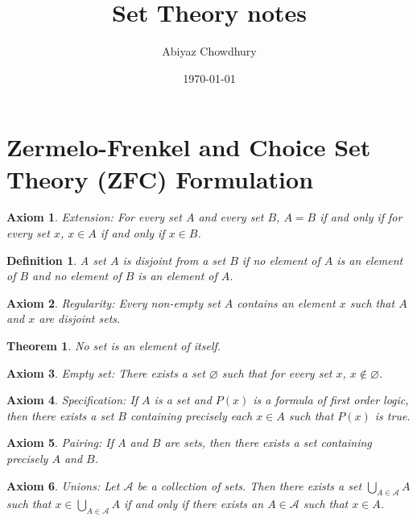 \documentclass[a4paper]{article}
\title{\textbf{Set Theory notes}}
\author{Abiyaz Chowdhury}
\date{\today}
\newtheorem{mytheorem}{Theorem}
\newtheorem{axiom}{Axiom}
\newtheorem{mydef}{Definition}
\numberwithin{mytheorem}{section}
\numberwithin{mydef}{section}
\numberwithin{axiom}{section}
\numberwithin{example}{section}
\begin{document}
\maketitle

\section{Zermelo-Frenkel and Choice Set Theory (ZFC) Formulation}

\begin{axiom} Extension: For every set $A$ and every set $B$, $A = B$ if and only if for every set $x$, $x \in A$ if and only if $x \in B$. 
\end{axiom}

\begin{mydef} A set $A$ is disjoint from a set $B$ if no element of $A$ is an element of $B$ and no element of $B$ is an element of $A$. 
\end{mydef}

\begin{axiom} Regularity: Every non-empty set $A$ contains an element $x$ such that $A$ and $x$ are disjoint sets.
\end{axiom}

\begin{mytheorem} No set is an element of itself. \end{mytheorem}

\begin{axiom} Empty set: There exists a set $\varnothing$ such that for every set $x$, $x \notin \varnothing$.
\end{axiom}


\begin{axiom} Specification: If $A$ is a set and $P(x)$ is a formula of first order logic, then there exists a set $B$ containing precisely each $x \in A$ such that $P(x)$ is true. 
\end{axiom}

\begin{axiom} Pairing: If $A$ and $B$ are sets, then there exists a set containing precisely $A$ and $B$.
\end{axiom}

\begin{axiom} Unions: Let $\mathcal{A}$ be a collection of sets. Then there exists a set $\bigcup\limits_{A \in \mathcal{A}} A$ such that $x \in \bigcup\limits_{A \in \mathcal{A}} A$ if and only if there exists an $A \in \mathcal{A}$ such that $x \in A$.
\end{axiom}
\end{document}
